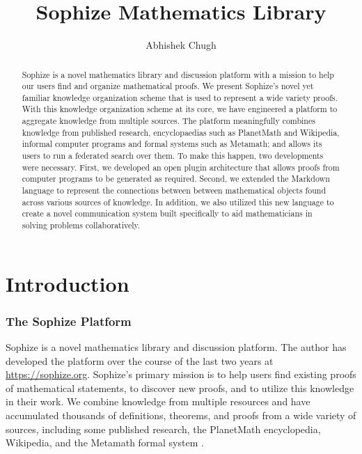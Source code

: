 \documentclass[a4paper]{article}
\title{Sophize Mathematics Library}
\author{ Abhishek Chugh }
\begin{document}
\maketitle

\begin{abstract}
Sophize is a novel mathematics library and discussion platform with a mission to help our users find and organize mathematical proofs. We present Sophize's novel yet familiar knowledge organization scheme that is used to represent a wide variety proofs. With this knowledge organization scheme at its core, we have engineered a platform to aggregate knowledge from multiple sources. The platform meaningfully combines knowledge from published research, encyclopaedias such as PlanetMath and Wikipedia, informal computer programs and formal systems such as Metamath; and allows its users to run a federated search over them. To make this happen, two developments were necessary. First, we developed an open plugin architecture that allows proofs from computer programs to be generated as required. Second, we extended the Markdown language to represent the connections between between mathematical objects found across various sources of knowledge. In addition, we also utilized this new language to create a novel communication system built specifically to aid mathematicians in solving problems collaboratively.

\end{abstract}

\vskip 32pt

\section{Introduction}

\subsubsection*{The Sophize Platform}


Sophize is a novel mathematics library and discussion platform. The author has developed the platform over the course of the last two years at \url{https://sophize.org}. Sophize's primary mission is to help users find existing proofs of mathematical statements, to discover new proofs, and to utilize this knowledge in their work. We combine knowledge from multiple resources and have accumulated thousands of definitions, theorems, and proofs from a wide variety of sources, including some published research, the PlanetMath encyclopedia, Wikipedia, and the Metamath formal system \cite{metamath}.
\end{document}
